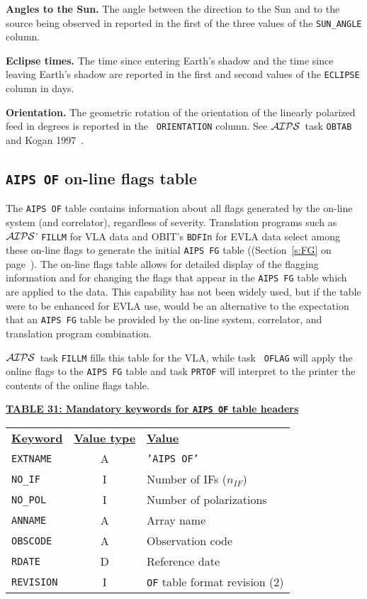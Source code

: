 \documentclass[twoside]{article}
\newcommand{\AIPS}{{$\cal AIPS\/$}}
\newcommand{\nif}{$n_{IF}$}
\begin{document}
{\bf Angles to the Sun.}  The angle between the direction to the Sun
and to the source being observed in reported in the first of the three
values of the {\tt SUN\_ANGLE} column.

{\bf Eclipse times.}  The time since entering Earth's shadow and the
time since leaving Earth's shadow are reported in the first and second
values of the {\tt ECLIPSE} column in days.

{\bf Orientation.}  The geometric rotation of the orientation of the
linearly polarized feed in degrees is reported in the {\tt
  ORIENTATION} column.  See \AIPS\ task {\tt OBTAB} and Kogan
1997~\cite{K97}.

\subsection{{\tt AIPS OF} on-line flags table}
\label{s:OF}

The {\tt AIPS OF} table contains information about all flags generated
by the on-line system (and correlator), regardless of severity.
Translation programs such as \AIPS' {\tt FILLM} for VLA data and
OBIT's {\tt BDFIn} for EVLA data select among these on-line flags to
generate the initial {\tt AIPS FG} table ((Section~\ref{s:FG} on
page~\pageref{s:FG}).  The on-line flags table allows for detailed
display of the flagging information and for changing the flags that
appear in the {\tt AIPS FG} table which are applied to the data.
This capability has not been widely used, but if the table were to be
enhanced for EVLA use, would be an alternative to the expectation that
an {\tt AIPS FG} table be provided by the on-line system, correlator,
and translation program combination.

\AIPS\ task {\tt FILLM} fills this table for the VLA, while task {\tt
  OFLAG} will apply the online flags to the {\tt AIPS FG} table and
task {\tt PRTOF} will interpret to the printer the contents of the
online flags table.

\begin{center}
\underline{\bf{TABLE 31: Mandatory keywords for {\tt AIPS OF} table
    headers}}\\
\begin{tabular}{lcl}
\noalign{\vspace{2pt}} \label{ta:OFkeys}
\underline{{\bf Keyword}} & \underline{\bf{Value type}} &
    \underline{\bf{Value\vphantom{y}}} \\
\noalign{\vspace{2pt}}
{\tt EXTNAME}   & A & {\tt 'AIPS OF'}  \\
{\tt NO\_IF}    & I & Number of IFs (\nif)\\
{\tt NO\_POL}   & I & Number of polarizations \\
{\tt ANNAME}    & A & Array name \\
{\tt OBSCODE}   & A & Observation code \\
{\tt RDATE}     & D & Reference date \\
{\tt REVISION}  & I & {\tt OF} table format revision (2)
\end{tabular}
\end{center}
\end{document}
